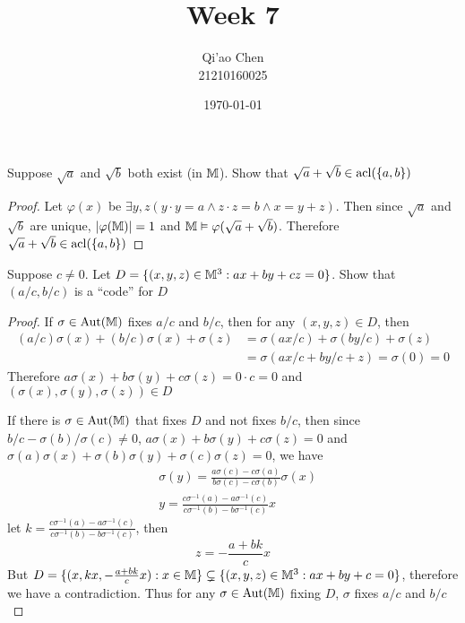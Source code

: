 \documentclass[11pt]{article}
\author{Qi'ao Chen\\21210160025}
\date{\today}
\title{Week 7}
\begin{document}
\maketitle
\begin{exercise}
Suppose \(\sqrt{a}\) and \(\sqrt{b}\) both exist (in \(\mathbb{M}\)). Show that \(\sqrt{a}+\sqrt{b}\in\operatorname{acl}(\{a,b\})\)
\end{exercise}

\begin{proof}
Let \(\varphi(x)\) be \(\exists y,z(y\cdot y=a\wedge z\cdot z=b\wedge x=y+z)\). Then since \(\sqrt{a}\) and \(\sqrt{b}\) are
unique, \(\abs{\varphi(\M)}=1\) and \(\mathbb{M}\vDash\varphi(\sqrt{a}+\sqrt{b})\). Therefore \(\sqrt{a}+\sqrt{b}\in\operatorname{acl}(\{a,b\})\)
\end{proof}

\begin{exercise}
Suppose \(c\neq 0\). Let \(D=\{(x,y,z)\in\mathbb{M}^3:ax+by+cz=0\}\). Show that \((a/c,b/c)\) is a ``code'' for \(D\)
\end{exercise}

\begin{proof}
If \(\sigma\in\operatorname{\text{Aut}}(\mathbb{M})\) fixes \(a/c\) and \(b/c\), then for any \((x,y,z)\in D\), then
\begin{align*}
(a/c)\sigma(x)+(b/c)\sigma(x)+\sigma(z)&=\sigma(ax/c)+\sigma(by/c)+\sigma(z)\\
&=\sigma(ax/c+by/c+z)=\sigma(0)=0
\end{align*}
Therefore \(a\sigma(x)+b\sigma(y)+c\sigma(z)=0\cdot c=0\) and \((\sigma(x),\sigma(y),\sigma(z))\in D\)

If there is \(\sigma\in\operatorname{\text{Aut}}(\mathbb{M})\) that fixes \(D\) and not fixes \(b/c\), then since \(b/c-\sigma(b)/\sigma(c)\neq 0\),  \(a\sigma(x)+b\sigma(y)+c\sigma(z)=0\)
and \(\sigma(a)\sigma(x)+\sigma(b)\sigma(y)+\sigma(c)\sigma(z)=0\), we have
\begin{align*}
&\sigma(y)=\frac{a\sigma(c)-c\sigma(a)}{b\sigma(c)-c\sigma(b)}\sigma(x)\\
&y=\frac{c\sigma^{-1}(a)-a\sigma^{-1}(c)}{c\sigma^{-1}(b)-b\sigma^{-1}(c)}x
\end{align*}
let \(k=\frac{c\sigma^{-1}(a)-a\sigma^{-1}(c)}{c\sigma^{-1}(b)-b\sigma^{-1}(c)}\), then
\begin{equation*}
z=-\frac{a+bk}{c}x
\end{equation*}
But \(D=\{(x,kx,-\frac{a+bk}{c}x):x\in\mathbb{M}\}\subsetneq\{(x,y,z)\in\mathbb{M}^3:ax+by+c=0\}\), therefore we have a
contradiction. Thus for any \(\sigma\in\operatorname{\text{Aut}}(\mathbb{M})\) fixing \(D\), \(\sigma\) fixes \(a/c\) and \(b/c\)
\end{proof}
\end{document}
